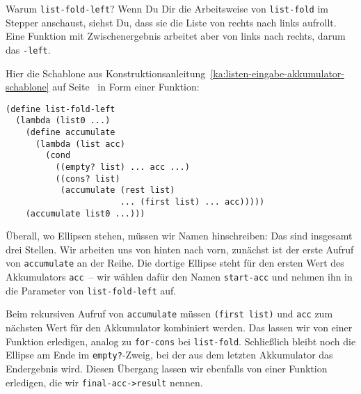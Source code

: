 Warum \lstinline{list-fold-left}?  Wenn Du Dir die Arbeitsweise von
\lstinline{list-fold} im Stepper anschaust, siehst Du, dass sie die
Liste von rechts nach links aufrollt.  Eine Funktion mit
Zwischenergebnis arbeitet aber von links nach rechts, darum das
\lstinline{-left}.  

Hier die Schablone aus
Konstruktionsanleitung~\ref{ka:listen-eingabe-akkumulator-schablone}
auf Seite~\pageref{ka:listen-eingabe-akkumulator-schablone} in Form
einer Funktion:
%
\begin{lstlisting}
(define list-fold-left
  (lambda (list0 ...)
    (define accumulate
      (lambda (list acc)
        (cond
          ((empty? list) ... acc ...)
          ((cons? list)
           (accumulate (rest list)
                       ... (first list) ... acc)))))
    (accumulate list0 ...)))
\end{lstlisting}
%
Überall, wo Ellipsen stehen, müssen wir Namen hinschreiben: Das sind
insgesamt drei Stellen.  Wir arbeiten uns von hinten nach vorn,
zunächst ist der erste Aufruf von \lstinline{accumulate} an der
Reihe.  Die dortige Ellipse steht für den ersten Wert des Akkumulators
\lstinline{acc}~-- wir wählen dafür den Namen \lstinline{start-acc}
und nehmen ihn in die Parameter von \lstinline{list-fold-left} auf.

Beim rekursiven Aufruf von \lstinline{accumulate} müssen
\lstinline{(first list)} und \lstinline{acc} zum nächsten Wert für den
Akkumulator kombiniert werden.  Das lassen wir von einer Funktion
erledigen, analog zu \lstinline{for-cons} bei \lstinline{list-fold}.
Schließlich bleibt noch die Ellipse am Ende im
\lstinline{empty?}-Zweig, bei der aus dem letzten Akkumulator das
Endergebnis wird.  Diesen Übergang lassen wir ebenfalls von einer
Funktion erledigen, die wir \lstinline{final-acc->result} nennen.

